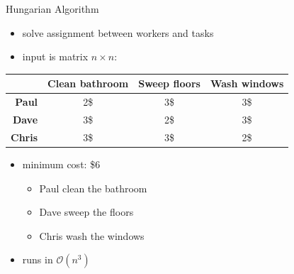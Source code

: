 \documentclass[ignorenonframetext,aspectratio=169,]{paradise-slide}
\providecommand{\tightlist}{%
  \setlength{\itemsep}{0pt}\setlength{\parskip}{0pt}}
\begin{document}
\begin{frame}[fragile]{Hungarian Algorithm}
\protect\hypertarget{hungarian-algorithm}{}

\begin{itemize}
\tightlist
\item
  solve assignment between workers and tasks
\item
  input is matrix \(n\times n\):
\end{itemize}

\begin{table}[]
\begin{tabular}{@{}rccc@{}}
\toprule
               & \textbf{Clean bathroom} & \textbf{Sweep floors} & \textbf{Wash windows} \\ \midrule
\textbf{Paul}  & 2\$                     & 3\$                   & 3\$                   \\
\textbf{Dave}  & 3\$                     & 2\$                   & 3\$                   \\
\textbf{Chris} & 3\$                     & 3\$                   & 2\$                   \\ \bottomrule
\end{tabular}
\end{table}

\begin{itemize}
\tightlist
\item
  minimum cost: \$6

  \begin{itemize}
  \tightlist
  \item
    Paul clean the bathroom
  \item
    Dave sweep the floors
  \item
    Chris wash the windows
  \end{itemize}
\item
  runs in \(\mathcal{O}(n^3)\)
\end{itemize}

\end{frame}
\end{document}
